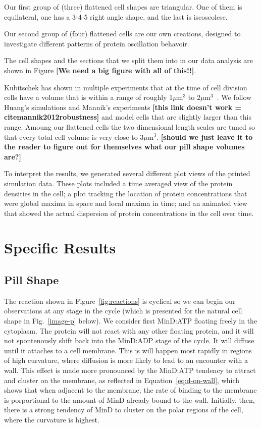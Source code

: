 \documentclass[letterpaper,twocolumn,amsmath,amssymb,pre]{revtex4-1}
\newcommand{\red}[1]{{\bf \color{red} #1}}
\newcommand{\fixme}[1]{\red{[#1]}}
\newcommand\micron{\ensuremath{\mu\text{m}}}
\begin{document}
Our first group of (three) flattened cell shapes are triangular.  One
of them is equilateral, one has a 3-4-5 right angle shape, and the
last is iscoscolese.

Our second group of (four) flattened cells are our own creations,
designed to investigate different patterns of protein oscillation
behavoir.

The cell shapes and the sections that we split them into in our data
analysis are shown in Figure \fixme{We need a big figure with all of this!!}.

Kubitschek has shown in multiple experiments that at the time of cell
division cells have a volume that is within a range of roughly
$1\micron^3$ to $2\micron^3$~\cite{kubitschek1990cell,
  kubitschek1968linear}.  We follow Huang's
simulations\cite{huang2003dynamic} and Mannik's experiments
\fixme{this link doesn't work = cite{mannik2012robustness}} and model
cells that are slightly larger than this range.  Amoung our flattened
cells the two dimensional length scales are tuned so that every total
cell volume is very close to $3\micron^3$.  \fixme{should we just
  leave it to the reader to figure out for themselves what our pill
  shape volumes are?}


To interpret the results, we generated several different plot views of
the printed simulation data. These plots included a time averaged view
of the protein densities in the cell; a plot tracking the location of
protein concentrations that were global maxima in space and local maxima in
time; and an animated view that showed the actual dispersion of
protein concentrations in the cell over time.
\section{Specific Results}

\subsection{Pill Shape}

The reaction shown in Figure~\ref{fig:reactions} is cyclical so we can
begin our observations at any stage in the cycle (which is presented
for the natural cell shape in Fig.~\ref{image-p} below).  We consider
first MinD:ATP floating freely in the cytoplasm.  The protein will not
react with any other floating protein, and it will not spontenously
shift back into the MinD:ADP stage of the cycle.  It will diffuse
until it attaches to a cell membrane.  This is will happen most
rapidly in regions of high curvature, where diffusion is more likely
to lead to an encounter with a wall.  This effect is made more
pronounced by the MinD:ATP tendency to attract and cluster on the
membrane, as reflected in Equation~\ref{eq:d-on-wall}, which shows
that when adjacent to the membrane, the rate of binding to the
membrane is porportional to the amount of MinD already bound to the
wall.  Initially, then, there is a strong tendency of MinD to cluster
on the polar regions of the cell, where the curvature is highest.
\end{document}
